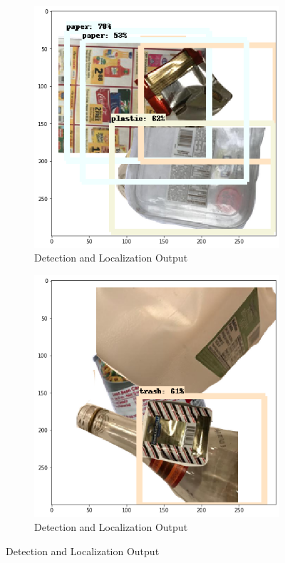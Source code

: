 \documentclass{article}
\begin{document}
\begin{figure}
    \centering
    \begin{subfigure}{0.3\linewidth}
    \includegraphics[width=\linewidth]{data/images/04_random_collage/Output_1.png}
    \caption{Detection and Localization Output}
    \end{subfigure}
    \begin{subfigure}{0.3\linewidth}
    \includegraphics[width=\linewidth]{data/images/04_random_collage/Output_2.png}
    \caption{Detection and Localization Output}
    \end{subfigure}
    
    \label{fig:random_collage}
\end{figure}
\end{document}
